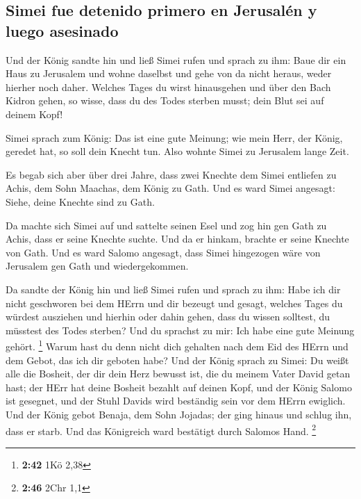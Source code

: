 \hypertarget{simei-fue-detenido-primero-en-jerusaluxe9n-y-luego-asesinado}{%
\subsection{Simei fue detenido primero en Jerusalén y luego
asesinado}\label{simei-fue-detenido-primero-en-jerusaluxe9n-y-luego-asesinado}}

 Und der König sandte hin und ließ Simei rufen und sprach
zu ihm: Baue dir ein Haus zu Jerusalem und wohne daselbst und gehe von
da nicht heraus, weder hierher noch daher.  Welches Tages
du wirst hinausgehen und über den Bach Kidron gehen, so wisse, dass du
des Todes sterben musst; dein Blut sei auf deinem Kopf!

 Simei sprach zum König: Das ist eine gute Meinung; wie
mein Herr, der König, geredet hat, so soll dein Knecht tun. Also wohnte
Simei zu Jerusalem lange Zeit.

 Es begab sich aber über drei Jahre, dass zwei Knechte
dem Simei entliefen zu Achis, dem Sohn Maachas, dem König zu Gath. Und
es ward Simei angesagt: Siehe, deine Knechte sind zu Gath.

 Da machte sich Simei auf und sattelte seinen Esel und
zog hin gen Gath zu Achis, dass er seine Knechte suchte. Und da er
hinkam, brachte er seine Knechte von Gath.  Und es ward
Salomo angesagt, dass Simei hingezogen wäre von Jerusalem gen Gath und
wiedergekommen.

 Da sandte der König hin und ließ Simei rufen und sprach
zu ihm: Habe ich dir nicht geschworen bei dem HErrn und dir bezeugt und
gesagt, welches Tages du würdest ausziehen und hierhin oder dahin gehen,
dass du wissen solltest, du müsstest des Todes sterben? Und du sprachst
zu mir: Ich habe eine gute Meinung gehört. \footnote{\textbf{2:42} 1Kö
  2,38}  Warum hast du denn nicht dich gehalten nach dem
Eid des HErrn und dem Gebot, das ich dir geboten habe? 
Und der König sprach zu Simei: Du weißt alle die Bosheit, der dir dein
Herz bewusst ist, die du meinem Vater David getan hast; der HErr hat
deine Bosheit bezahlt auf deinen Kopf,  und der König
Salomo ist gesegnet, und der Stuhl Davids wird beständig sein vor dem
HErrn ewiglich.  Und der König gebot Benaja, dem Sohn
Jojadas; der ging hinaus und schlug ihn, dass er starb. Und das
Königreich ward bestätigt durch Salomos Hand. \footnote{\textbf{2:46}
  2Chr 1,1}


